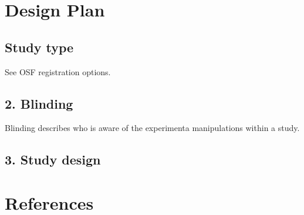 \documentclass[
  english,
  man]{apa6}
\begin{document}
\hypertarget{design-plan}{%
\section{Design Plan}\label{design-plan}}

\hypertarget{study-type}{%
\subsection{Study type}\label{study-type}}

See OSF registration options.

\hypertarget{blinding}{%
\subsection{2. Blinding}\label{blinding}}

Blinding describes who is aware of the experimenta manipulations within a study.

\hypertarget{study-design}{%
\subsection{3. Study design}\label{study-design}}

\newpage

\hypertarget{references}{%
\section{References}\label{references}}

\begingroup
\setlength{\parindent}{-0.5in}
\setlength{\leftskip}{0.5in}
\end{document}
